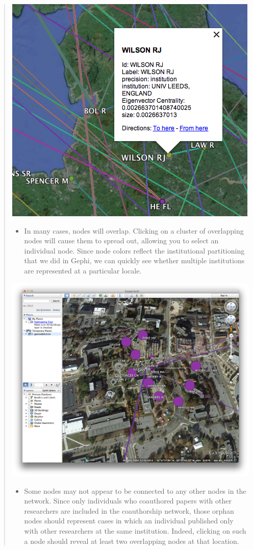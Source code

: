 \documentclass[letterpaper,10pt,english]{sphinxmanual}
\begin{document}
\begin{quote}
{\hfill\includegraphics{geo14.png}\hfill}
\begin{itemize}
\item {} 
In many cases, nodes will overlap. Clicking on a cluster of overlapping nodes will
cause them to spread out, allowing you to select an individual node. Since node
colors reflect the institutional partitioning that we did in Gephi, we can quickly
see whether multiple institutions are represented at a particular locale.

\end{itemize}

{\hfill\includegraphics{geo15.png}\hfill}
\begin{itemize}
\item {} 
Some nodes may not appear to be connected to any other nodes in the network. Since
only individuals who coauthored papers with other researchers are included in the
coauthorship network, those orphan nodes should represent cases in which an
individual published only with other researchers at the same institution. Indeed,
clicking on such a node should reveal at least two overlapping nodes at that
location.


\end{itemize}
\end{quote}
\end{document}

